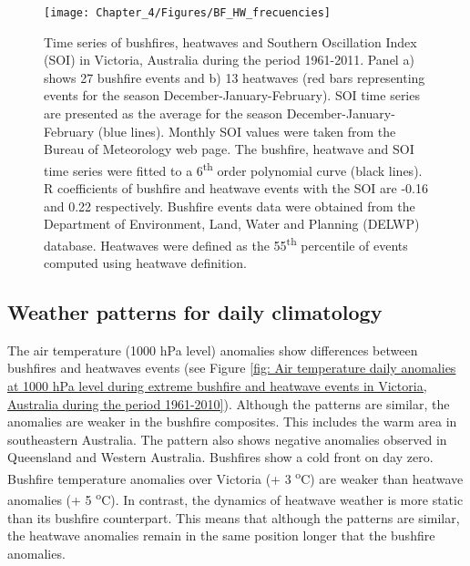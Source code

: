 \begin{figure}[h]
\noindent \begin{centering}
\texttt{[image: Chapter\_4/Figures/BF\_HW\_frecuencies]}
\par\end{centering}

\caption[Time series of bushfires, heatwaves and Southern Oscillation Index
(SOI) in Victoria, Australia during the period 1961-2011]{Time series of bushfires, heatwaves and Southern Oscillation Index
(SOI) in Victoria, Australia during the period 1961-2011. Panel a)
shows 27 bushfire events and b) 13 heatwaves (red bars representing
events for the season December-January-February). SOI time series
are presented as the average for the season December-January-February
(blue lines). Monthly SOI values were taken from the Bureau of Meteorology
web page. The bushfire, heatwave and SOI time series were fitted to
a 6\protect\textsuperscript{th} order polynomial curve (black lines).
R coefficients of bushfire and heatwave events with the SOI are -0.16
and 0.22 respectively. Bushfire events data were obtained from the
Department of Environment, Land, Water and Planning (DELWP) database.
Heatwaves were defined as the 55\protect\textsuperscript{th} percentile
of events computed using \citet{Nairn2009} heatwave definition. \label{fig:Time series of bushfires, heatwaves and Southern Oscillation Index (SOI) in Victoria, Australia during the period 1961-2011}}


\end{figure}



\subsection{Weather patterns for daily climatology }

The air temperature (1000 hPa level) anomalies show differences between
bushfires and heatwaves events (see Figure \ref{fig: Air temperature daily anomalies at 1000 hPa level during extreme bushfire and heatwave events in Victoria, Australia during the period 1961-2010}).
Although the patterns are similar, the anomalies are weaker in the
bushfire composites. This includes the warm area in southeastern Australia.
The pattern also shows negative anomalies observed in Queensland and
Western Australia. Bushfires show a cold front on day zero. Bushfire
temperature anomalies over Victoria (+ 3 \textsuperscript{o}C) are
weaker than heatwave anomalies (+ 5 \textsuperscript{o}C). In contrast,
the dynamics of heatwave weather is more static than its bushfire
counterpart. This means that although the patterns are similar, the
heatwave anomalies remain in the same position longer that the bushfire
anomalies. 

